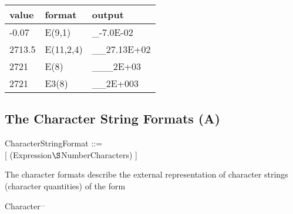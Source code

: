 \begin{added}
\begin{tabular}{lll}
value  & format    & output \\ \hline
-0.07  & E(9,1)    & \_-7.0E-02 \\
2713.5 & E(11,2,4) & \_\_27.13E+02 \\
2721   & E(8)      & \_\_\_2E+03 \\
2721   & E3(8)      & \_\_2E+003
\end{tabular}
\end{added}

\subsection{The Character String Formats (A)}  %
\label{sec_dation_a_format}

CharacterStringFormat ::=\\
 [ (Expression$\S $NumberCharacters) ]

The character formats describe the external representation of character
strings (character quantities) of the form

Character$^{...}$


